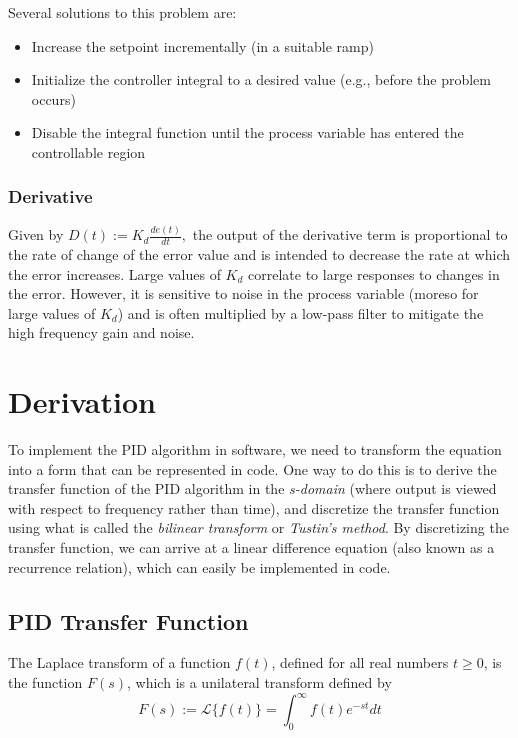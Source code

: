 \documentclass[11pt]{article}
\theoremstyle{definition}
\begin{document}
Several solutions to this problem are:

\begin{itemize}
    \item Increase the setpoint incrementally (in a suitable ramp)
    \item Initialize the controller integral to a desired value (e.g., before the problem occurs)
    \item Disable the integral function until the process variable has entered the controllable region
\end{itemize}

\subsubsection{Derivative}

Given by $D(t) := K_{d}\frac{de(t)}{dt},$ the output of the derivative term is proportional to the rate of change of the error value
and is intended to decrease the rate at which the error increases. Large values of $K_{d}$ correlate to large responses to changes in the
error. However, it is sensitive to noise in the process variable (moreso for large values of $K_{d}$) and is often multiplied by a low-pass
filter to mitigate the high frequency gain and noise.

\section{Derivation}

To implement the PID algorithm in software, we need to transform the equation into a form that can be represented in code. One way to do
this is to derive the transfer function of the PID algorithm in the \textit{s-domain} (where output is viewed with respect to frequency
rather than time), and discretize the transfer function using what is called the \textit{bilinear transform} or \textit{Tustin's method}.
By discretizing the transfer function, we can arrive at a linear difference equation (also known as a recurrence relation), which
can easily be implemented in code.

\subsection{PID Transfer Function}

The Laplace transform of a function $f(t)$, defined for all real numbers $t \geq 0$, is the function $F(s)$, which is a unilateral transform defined by 
\begin{equation} \label{eq2}
    \boxed{
        F(s) := \mathcal{L}\{f(t)\} = \int_{0}^{\infty}f(t)e^{-st}dt
    }
\end{equation}
\end{document}

